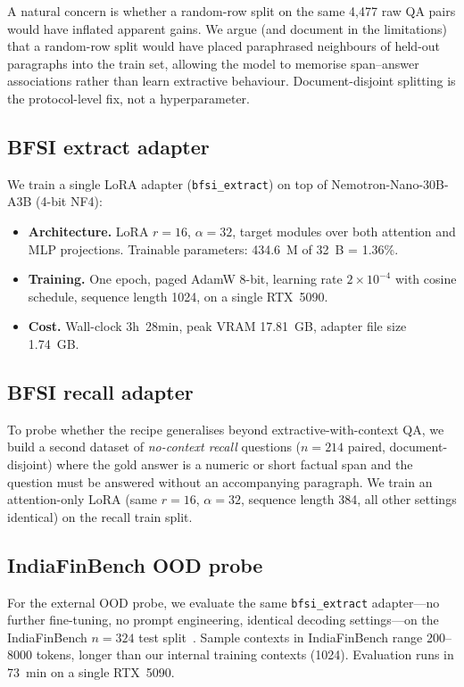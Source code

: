 \documentclass{article}
\begin{document}
A natural concern is whether a random-row split on the same 4{,}477 raw QA pairs would have inflated apparent gains. We argue (and document in the limitations) that a random-row split would have placed paraphrased neighbours of held-out paragraphs into the train set, allowing the model to memorise span--answer associations rather than learn extractive behaviour. Document-disjoint splitting is the protocol-level fix, not a hyperparameter.

\subsection{BFSI extract adapter}

We train a single LoRA adapter (\texttt{bfsi\_extract}) on top of Nemotron-Nano-30B-A3B (4-bit NF4):

\begin{itemize}
  \item \textbf{Architecture.} LoRA $r{=}16$, $\alpha{=}32$, target modules over both attention and MLP projections. Trainable parameters: 434.6~M of 32~B = 1.36\%.
  \item \textbf{Training.} One epoch, paged AdamW 8-bit, learning rate $2\times10^{-4}$ with cosine schedule, sequence length 1024, on a single RTX~5090.
  \item \textbf{Cost.} Wall-clock 3h~28min, peak VRAM 17.81~GB, adapter file size 1.74~GB.
\end{itemize}

\subsection{BFSI recall adapter}

To probe whether the recipe generalises beyond extractive-with-context QA, we build a second dataset of \emph{no-context recall} questions ($n{=}214$ paired, document-disjoint) where the gold answer is a numeric or short factual span and the question must be answered without an accompanying paragraph. We train an attention-only LoRA (same $r{=}16$, $\alpha{=}32$, sequence length 384, all other settings identical) on the recall train split.

\subsection{IndiaFinBench OOD probe}

For the external OOD probe, we evaluate the same \texttt{bfsi\_extract} adapter---no further fine-tuning, no prompt engineering, identical decoding settings---on the IndiaFinBench $n{=}324$ test split~\citep{pall2026indiafinbench}. Sample contexts in IndiaFinBench range 200--8000 tokens, longer than our internal training contexts (1024). Evaluation runs in 73~min on a single RTX~5090.
\end{document}
